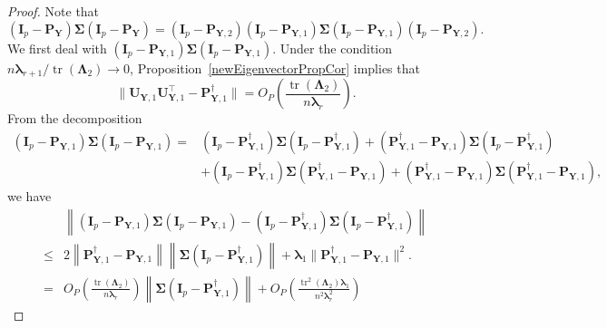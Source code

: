 \documentclass[10pt]{book}
\theoremstyle{definition}
\DeclareMathOperator{\mytr}{tr}
\newcommand{\bP}{\mathbf{P}}
\newcommand{\bY}{\mathbf{Y}}
\newcommand{\bI}{\mathbf{I}}
\newcommand{\bU}{\mathbf{U}}
\newcommand{\bfsym}[1]{\ensuremath{\boldsymbol{#1}}}
\def\blambda {\bfsym {\lambda}}
\def\bLambda {\bfsym {\Lambda}}
\def\bSigma {\bfsym {\Sigma}}
\begin{document}
\begin{proof}
    Note that
    \begin{equation}\label{cho111}
         (\bI_p-\bP_{\bY})\bSigma (\bI_p-\bP_{\bY})
         =
         (\bI_p-\bP_{\bY,2})
         (\bI_p-\bP_{\bY,1})
         \bSigma 
         (\bI_p-\bP_{\bY,1})
         (\bI_p-\bP_{\bY,2}).
    \end{equation}
We first deal with
    $
         (\bI_p-\bP_{\bY,1})
         \bSigma 
         (\bI_p-\bP_{\bY,1})
         $.
Under the condition $n\blambda_{r+1}/\mytr(\bLambda_2)\to 0$, Proposition~\ref{newEigenvectorPropCor} implies that
\begin{equation*}
        \|\bU_{\bY,1}\bU_{\bY,1}^\top - 
\bP^\dagger_{\bY,1}
        \|
    =O_P\left(\frac{\mytr(\bLambda_2)}{n\blambda_r}\right).
\end{equation*}
    From the decomposition
         \begin{equation*}
         \begin{split}
         (\bI_p-\bP_{\bY,1})
         \bSigma 
         (\bI_p-\bP_{\bY,1})
         =&
         (\bI_p-\bP_{\bY,1}^{\dagger})
         \bSigma 
         (\bI_p-\bP_{\bY,1}^{\dagger})
         +
         (\bP_{\bY,1}^{\dagger}-\bP_{\bY,1})
         \bSigma 
         (\bI_p-\bP_{\bY,1}^{\dagger})
         \\
         &+
         (\bI_p-\bP_{\bY,1}^{\dagger})
         \bSigma 
         (\bP_{\bY,1}^{\dagger}-\bP_{\bY,1})
         +
         (\bP_{\bY,1}^{\dagger}-\bP_{\bY,1})
         \bSigma 
         (\bP_{\bY,1}^{\dagger}-\bP_{\bY,1}),
         \end{split}
         \end{equation*}
we have
         \begin{equation*}
         \begin{split}
         &\left\|
         (\bI_p-\bP_{\bY,1})
         \bSigma 
         (\bI_p-\bP_{\bY,1})
         -
         (\bI_p-\bP_{\bY,1}^{\dagger})
         \bSigma 
         (\bI_p-\bP_{\bY,1}^{\dagger})
         \right\|
         \\
         \leq&
         2
         \left\|\bP_{\bY,1}^{\dagger}-\bP_{\bY,1}\right\|
         \left\|\bSigma 
         (\bI_p-\bP_{\bY,1}^{\dagger})\right\|
         +
         \blambda_1\|\bP_{\bY,1}^{\dagger}-\bP_{\bY,1}\|^2.
         \\
         = &
         O_P\left(\frac{\mytr(\bLambda_2)}{n\blambda_r}\right)
         \left\|\bSigma 
         (\bI_p-\bP_{\bY,1}^{\dagger})\right\|
         +
         O_P\left(\frac{\mytr^2(\bLambda_2)\blambda_1}{n^2\blambda_r^2}\right)

\end{split}
\end{equation*}
\end{proof}
\end{document}
